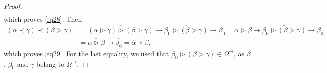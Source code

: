 \documentclass[pdftex]{sigma}
\numberwithin{equation}{section}
\begin{document}
\begin{proof}
\begin{align*}
\end{align*}
which proves \eqref{eq28}. Then
\begin{align*}
(\overline{\alpha}\prec \gamma)\prec (\beta \triangleright\gamma)&=\overline{(\alpha \triangleright \gamma)\triangleright (\beta \triangleright \gamma)}\rightarrow \overline{\beta_0\triangleright(\beta \triangleright \gamma)}\rightarrow \overline{\beta_0}=\overline{\alpha \triangleright \beta}\rightarrow \overline{\beta_0\triangleright(\beta \triangleright \gamma)}\rightarrow \overline{\beta_0}\\
&=\overline{\alpha \triangleright \beta}\rightarrow \overline{\beta_0}=\overline{\alpha}\prec \beta,
\end{align*}
which proves \eqref{eq29}. For the last equality, we used that $\beta_0\triangleright(\beta \triangleright \gamma)\in \Omega^\rightarrow$, as $\beta$, $\beta_0$ and $\gamma$ belong to $\Omega^\rightarrow$.


\end{proof}
\end{document}
